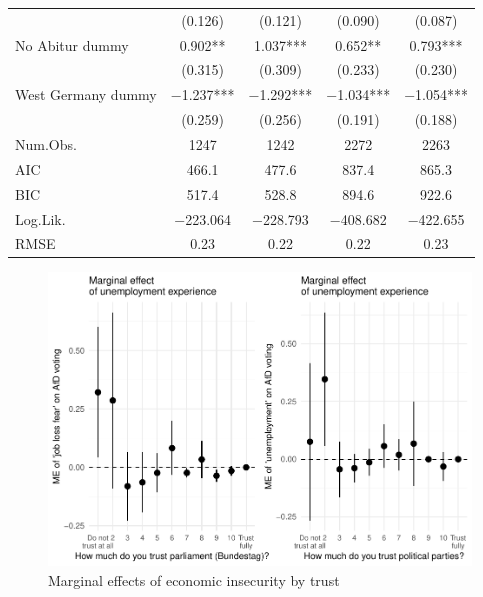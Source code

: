 \documentclass[
]{article}
\begin{document}
\begin{table}[!h]
\begin{tabular}[t]{lcccc}
 & (\num{0.126}) & (\num{0.121}) & (\num{0.090}) & (\num{0.087})\\
No Abitur dummy & \num{0.902}** & \num{1.037}*** & \num{0.652}** & \num{0.793}***\\
 & (\num{0.315}) & (\num{0.309}) & (\num{0.233}) & (\num{0.230})\\
West Germany dummy & \num{-1.237}*** & \num{-1.292}*** & \num{-1.034}*** & \num{-1.054}***\\
 & (\num{0.259}) & (\num{0.256}) & (\num{0.191}) & (\num{0.188})\\
\midrule
Num.Obs. & \num{1247} & \num{1242} & \num{2272} & \num{2263}\\
AIC & \num{466.1} & \num{477.6} & \num{837.4} & \num{865.3}\\
BIC & \num{517.4} & \num{528.8} & \num{894.6} & \num{922.6}\\
Log.Lik. & \num{-223.064} & \num{-228.793} & \num{-408.682} & \num{-422.655}\\
RMSE & \num{0.23} & \num{0.22} & \num{0.22} & \num{0.23}\\
\bottomrule
\end{tabular}
\end{table}

\begin{figure}
\centering
\includegraphics{AVCD_Draft_Assignment_Pruned_files/figure-latex/regression-results-1-plot2-1.pdf}
\caption{Marginal effects of economic insecurity by trust}
\end{figure}
\end{document}
